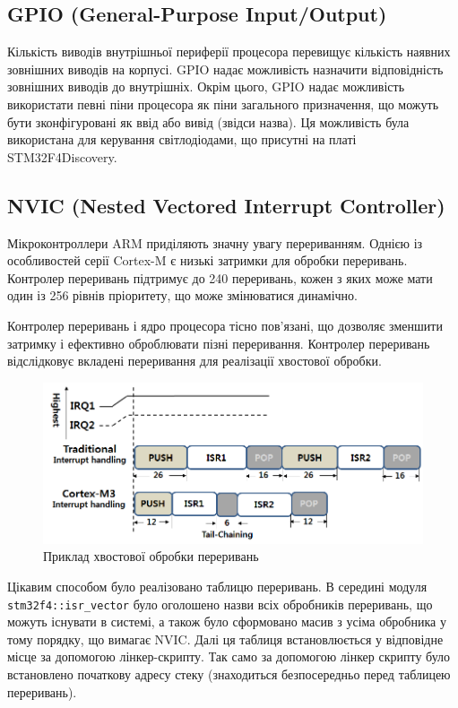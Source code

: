 \documentclass[oneside,14pt,a4paper,final]{myextreport}
\newcommand\code[1]{{\tt #1}}
\begin{document}
\subsection{GPIO (General-Purpose Input/Output)}

  Кількість виводів внутрішньої периферії процесора перевищує кількість наявних зовнішних виводів на корпусі. GPIO надає можливість назначити відповідність зовнішних виводів до внутрішніх. Окрім цього, GPIO надає можливість використати певні піни процесора як піни загального призначення, що можуть бути зконфігуровані як ввід або вивід (звідси назва). Ця можливість була використана для керування світлодіодами, що присутні на платі STM32F4Discovery.

\subsection{NVIC (Nested Vectored Interrupt Controller)}

Мікроконтроллери ARM приділяють значну увагу перериванням. Однією із особливостей серії Cortex-M є низькі затримки для обробки переривань. Контролер переривань підтримує до 240 переривань\cite{cortex-m:nvic}, кожен з яких може мати один із 256 рівнів пріоритету, що може змінюватися динамічно.

Контролер переривань і ядро процесора тісно пов'язані, що дозволяє зменшити затримку і ефективно оброблювати пізні переривання. Контролер переривань відслідковує вкладені переривання для реалізації хвостової обробки.

\begin{figure}[h]
  \includegraphics[width=\textwidth]{interrupt-tail-chaining}
  \caption{Приклад хвостової обробки переривань}\label{fig:interrupt-tail-chaining}
\end{figure}

Цікавим способом було реалізовано таблицю переривань. В середині модуля \code{stm32f4::isr\_vector} було оголошено назви всіх обробників переривань, що можуть існувати в системі, а також було сформовано масив з усіма обробника у тому порядку, що вимагає NVIC. Далі ця таблиця встановлюється у відповідне місце за допомогою лінкер-скрипту. Так само за допомогою лінкер скрипту було встановлено початкову адресу стеку (знаходиться безпосередньо перед таблицею переривань).
\end{document}
